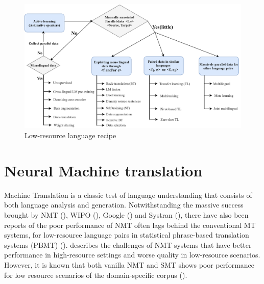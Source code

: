\documentclass[manuscript,screen]{acmart}
\begin{document}
\begin{figure}[!h]
  \centering
  \includegraphics[width=0.9\linewidth]{LRLRecipe.png}
  \caption{Low-resource language recipe}
  \label{RecLRL}
\end{figure}



\section{Neural Machine translation}
\label{neural}
Machine Translation is a classic test of language understanding that consists of both language analysis and generation.
Notwithstanding the massive success brought by NMT (\citet{sutskever2014sequence,DBLP:journals/corr/BahdanauCB14,bojar2016findings}), WIPO (\citet{pouliquen2017wipo, vaswani2017attention}), Google (\citet{wu2016google}) and Systran (\citet{crego2016systran}), there have also been reports of the poor performance of NMT often lags behind the conventional MT systems, for low-resource language pairs in statistical phrase-based translation systems (PBMT) (\citet{koehn2003statistical}). 
\citet{koehn2017six} describes the challenges of NMT systems that have better performance in high-resource settings and worse quality in low-resource scenarios. 
However, it is known that both vanilla NMT and SMT shows poor performance for low resource scenarios of the domain-specific corpus
 (\citet{duh2013adaptation,sennrich2013multi,zoph2016transfer,koehn2017neural}).
\end{document}
